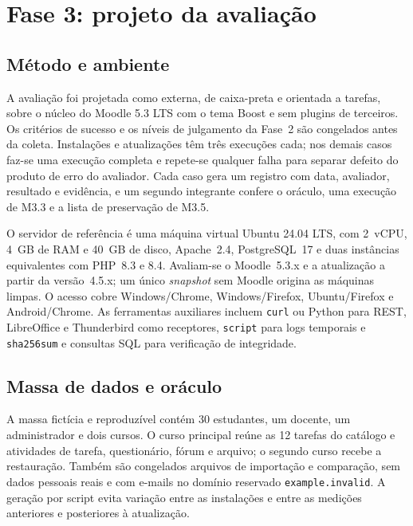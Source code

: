 \documentclass[12pt]{article}
\begin{document}
\section{Fase 3: projeto da avaliação}
\label{sec:fase3}

\subsection{Método e ambiente}

A avaliação foi projetada como externa, de caixa-preta e orientada a tarefas, sobre o núcleo do Moodle 5.3 LTS com o tema Boost e sem plugins de terceiros. Os critérios de sucesso e os níveis de julgamento da Fase~2 são congelados antes da coleta. Instalações e atualizações têm três execuções cada; nos demais casos faz-se uma execução completa e repete-se qualquer falha para separar defeito do produto de erro do avaliador. Cada caso gera um registro com data, avaliador, resultado e evidência, e um segundo integrante confere o oráculo, uma execução de M3.3 e a lista de preservação de M3.5.

O servidor de referência é uma máquina virtual Ubuntu 24.04 LTS, com 2~vCPU, 4~GB de RAM e 40~GB de disco, Apache~2.4, PostgreSQL~17 e duas instâncias equivalentes com PHP~8.3 e 8.4. Avaliam-se o Moodle~5.3.x e a atualização a partir da versão~4.5.x; um único \emph{snapshot} sem Moodle origina as máquinas limpas. O acesso cobre Windows/Chrome, Windows/Firefox, Ubuntu/Firefox e Android/Chrome. As ferramentas auxiliares incluem \texttt{curl} ou Python para REST, LibreOffice e Thunderbird como receptores, \texttt{script} para logs temporais e \texttt{sha256sum} e consultas SQL para verificação de integridade.

\subsection{Massa de dados e oráculo}

A massa fictícia e reproduzível contém 30 estudantes, um docente, um administrador e dois cursos. O curso principal reúne as 12 tarefas do catálogo e atividades de tarefa, questionário, fórum e arquivo; o segundo curso recebe a restauração. Também são congelados arquivos de importação e comparação, sem dados pessoais reais e com e-mails no domínio reservado \texttt{example.invalid}. A geração por script evita variação entre as instalações e entre as medições anteriores e posteriores à atualização.
\end{document}
